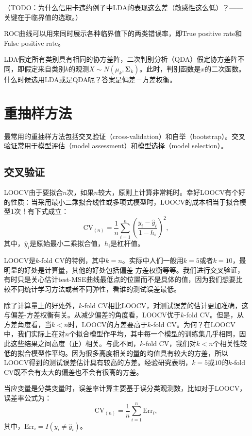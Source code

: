 \documentclass[hyperref,]{ctexart}
\begin{document}
（TODO：为什么信用卡违约例子中LDA的表现这么差（敏感性这么低）？------关键在于临界值的选取。）

ROC曲线可以用来同时展示各种临界值下的两类错误率，即True positive
rate和False positive rate。

LDA假定所有类别具有相同的协方差阵，二次判别分析（QDA）假定协方差阵不同，即假定来自类别\(k\)的观测\(X\sim N(\mu_k,\mathbf{\Sigma}_k)\)。此时，判别函数是\(x\)的二次函数。什么时候选用LDA或是QDA呢？答案是偏差－方差权衡。

\section{重抽样方法}

最常用的重抽样方法包括交叉验证（cross-validation）和自举（bootstrap）。交叉验证常用于模型评估（model
assessment）和模型选择（model selection）。

\subsection{交叉验证}

LOOCV由于要拟合\(n\)次，如果\(n\)较大，原则上计算非常耗时。幸好LOOCV有个好的性质：当采用最小二乘拟合线性或多项式模型时，LOOCV的成本相当于拟合模型1次！有下式成立：
\[\mathrm{CV}_{(n)}=\frac{1}{n}\sum_{i=1}^{n}\left(\frac{y_i - \hat{y}_i}{1-h_i}\right)^2,\]
其中，\(\hat{y}_i\)是原始最小二乘拟合值，\(h_i\)是杠杆值。

LOOCV是\(k\)-fold
CV的特例，其中\(k=n\)。实际中人们一般用\(k=5\)或者\(k=10\)，最明显的好处是计算量，其他的好处包括偏差-方差权衡等等。我们进行交叉验证，有时只是关心估计test-MSE曲线最低点的位置而不是具体的值，因为我们想要比较不同统计学习方法或者不同弹性，看谁的测试误差最低。

除了计算量上的好处外，\(k\)-fold
CV相比LOOCV，对测试误差的估计更加准确，这与偏差-方差权衡有关。从减少偏差的角度看，LOOCV优于\(k\)-fold
CV。但是，从方差角度看，当\(k<n\)时，LOOCV的方差要高于\(k\)-fold
CV。为何？在LOOCV中，我们实际上在对\(n\)个拟合模型作平均，其中每一个模型的训练集几乎相同，因此这些结果之间高度（正）相关。与此不同，\(k\)-fold
CV，我们对\(k<n\)个相关性较低的拟合模型作平均。因为很多高度相关的量的均值具有较大的方差，所以LOOCV得到的测试误差估计具有较高的方差。经验研究表明，\(k=5\)或\(10\)的\(k\)-fold
CV既不会有太大的偏差也不会有很高的方差。

当应变量是分类变量时，误差率计算主要基于误分类观测数，比如对于LOOCV，误差率公式为：
\[\mathrm{CV}_{(n)}=\frac{1}{n}\sum_{i=1}^{n}\mathrm{Err}_i,\]
其中，\(\mathrm{Err}_i=I(y_i\neq \hat{y}_i)\)。
\end{document}
